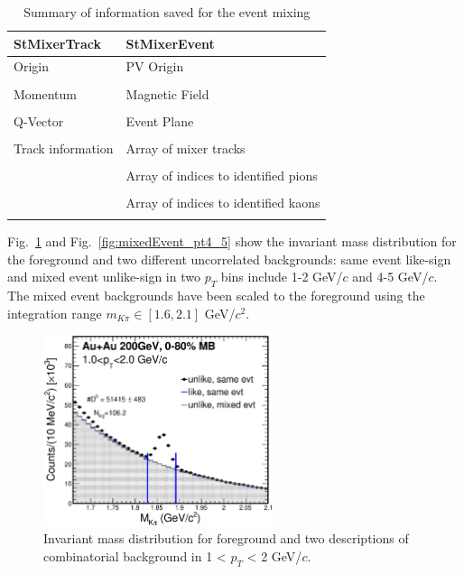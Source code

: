 \begin{table}[htp]
\centering
\caption{Summary of information saved for the event mixing}
\label{eventBuf}
\begin{tabular}{ l | l  }
\toprule[1.6pt]
StMixerTrack & StMixerEvent \\
\midrule[1.2pt]
Origin & PV Origin \\
\\
Momentum & Magnetic Field \\
\\
Q-Vector & Event Plane \\
\\
Track information & Array of mixer tracks \\
\\
  &Array of indices to identified pions \\
\\
  & Array of indices to identified kaons \\
\\
\bottomrule[1.6pt]
\end{tabular}
\end{table}

Fig.~\ref{fig:mixedEvent_pt1_2} and Fig.~\ref{fig:mixedEvent_pt4_5} show the invariant mass distribution for the foreground and two different uncorrelated backgrounds: same event like-sign and mixed event unlike-sign in two $p_T$ bins include 1-2 GeV/$c$ and 4-5 GeV/$c$. The mixed event backgrounds have been scaled to the foreground using the integration range $m_{K\pi}\in[1.6,2.1]$ GeV/$c^{2}$.

\begin{figure}[htbp]
\centering
\includegraphics[keepaspectratio,width=0.6\textwidth]{figure/Run14_D0HFT/Mixed_cent_1_9_pt_1_2.eps}
\caption{Invariant mass distribution for foreground and two descriptions of combinatorial background in 1 < $p_T$ < 2 GeV/$c$.}
\label{fig:mixedEvent_pt1_2}
\end{figure}

